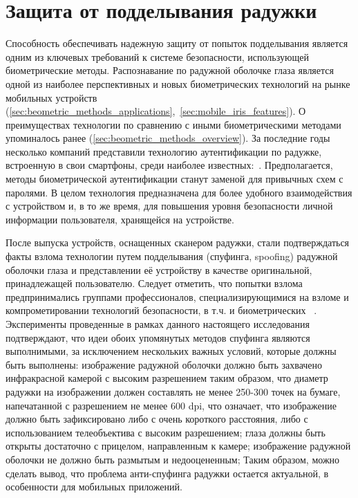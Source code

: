 \chapter{Защита от подделывания радужки}
\label{chapter:anti-spoofing}

Способность обеспечивать надежную защиту от попыток подделывания является одним из ключевых требований к системе безопасности, использующей биометрические методы. Распознавание по радужной оболочке глаза является одной из наиболее перспективных и новых биометрических технологий на рынке мобильных устройств (\ref{sec:beometric_methods_applications},~\ref{sec:mobile_iris_features}). О преимуществах технологии по сравнению с иными биометрическими методами упоминалось ранее (\ref{sec:beometric_methods_overview}). За последние годы несколько компаний представили технологию аутентификации по радужке, встроенную в свои смартфоны, среди наиболее известных:~\cite{deltaId,lumia_950,samsung_iris}. Предполагается, методы биометрической аутентификации станут заменой для привычных схем с паролями. В целом технология предназначена для более удобного взаимодействия с устройством и, в то же время, для повышения уровня безопасности личной информации пользователя, хранящейся на устройстве.

После выпуска устройств, оснащенных сканером радужки, стали подтверждаться факты взлома технологии путем подделывания (спуфинга, spoofing) радужной оболочки глаза и представлении её устройству в качестве оригинальной, принадлежащей пользователю. Следует отметить, что попытки взлома предпринимались группами профессионалов, специализирующимися на взломе и компрометировании технологий безопасности, в т.ч. и биометрических ~\cite{ccc,bkav}. Эксперименты проведенные в рамках данного настоящего исследования подтверждают, что идеи обоих упомянутых методов спуфинга являются выполнимыми, за исключением нескольких важных условий, которые должны быть выполнены: изображение радужной оболочки должно быть захвачено инфракрасной камерой с высоким разрешением таким образом, что диаметр радужки на изображении должен составлять не менее 250-300 точек на бумаге, напечатанной с разрешением не менее 600 dpi, что означает, что изображение должно быть зафиксировано либо с очень короткого расстояния, либо с использованием телеобъектива с высоким разрешением; глаза должны быть открыты достаточно с прицелом, направленным к камере; изображение радужной оболочки не должно быть размытым и недооцененным; Таким образом, можно сделать вывод, что проблема анти-спуфинга радужки остается актуальной, в особенности для мобильных приложений.

